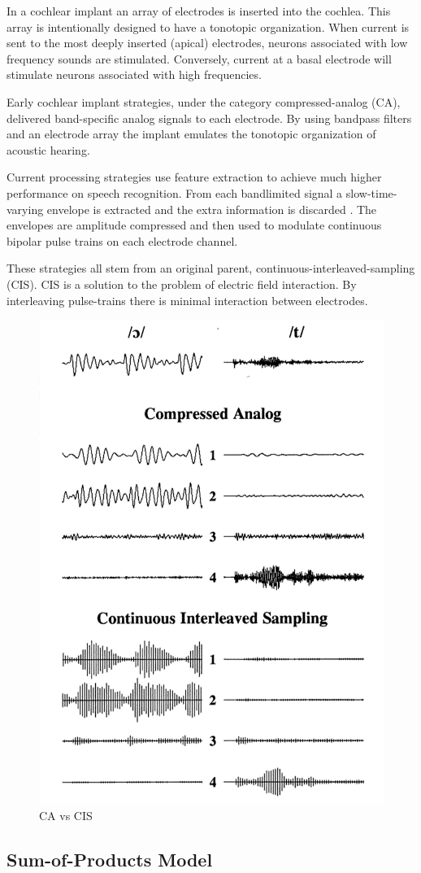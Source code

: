 \documentclass [11pt, proquest,oneside] {ganter_thesis}[2015/03/03]
\begin{document}
In a cochlear implant an array of electrodes is inserted into the cochlea.  This array is intentionally designed to have a tonotopic organization.  When current is sent to the most deeply inserted (apical) electrodes, neurons associated with low frequency sounds are stimulated.  Conversely, current at a basal electrode will stimulate neurons associated with high frequencies.

Early cochlear implant strategies, under the category compressed-analog (CA), delivered band-specific analog signals to each electrode.  By using bandpass filters and an electrode array the implant emulates the tonotopic organization of acoustic hearing.

Current processing strategies use feature extraction to achieve much higher performance on speech recognition.  From each bandlimited signal a slow-time-varying envelope is extracted and the extra information is discarded \cite{vandali2005pitch}.  The envelopes are amplitude compressed and then used to modulate continuous bipolar pulse trains on each electrode channel.

These strategies all stem from an original parent, continuous-interleaved-sampling (CIS).  CIS is a solution to the problem of electric field interaction.  By interleaving pulse-trains there is minimal interaction between electrodes.


\begin{figure}[!ht]
  \centering
    \includegraphics[width=.5\textwidth]{caVScis}   
    \caption{CA vs CIS}
\end{figure}

\subsection{Sum-of-Products Model}
\end{document}
